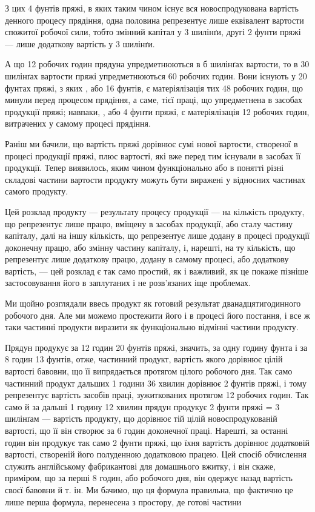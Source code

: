 З цих 4 фунтів пряжі, в яких таким чином існує вся новоспродукована вартість денного процесу
прядіння, одна половина
репрезентує лише еквівалент вартости спожитої робочої сили, тобто змінний капітал у 3 шилінґи, другі
2 фунти пряжі — лише додаткову вартість у 3 шилінґи.

А що 12 робочих годин прядуна упредметнюються в б шилінґах вартости, то в 30 шилінґах вартости пряжі
упредметнюються 60 робочих годин. Вони існують у 20 фунтах пряжі, з яких ,
або 16 фунтів, є матеріялізація тих 48 робочих годин, що минули перед процесом прядіння, а саме,
тієї праці, що упредметнена в засобах продукції пряжі; навпаки, , або 4 фунти пряжі, є
матеріялізація 12 робочих годин, витрачених у самому процесі прядіння.

Раніш ми бачили, що вартість пряжі дорівнює сумі нової вартости, створеної в процесі продукції
пряжі, плюс вартості,
які вже перед тим існували в засобах її продукції. Тепер виявилось, яким чином функціонально або в
понятті різні складові
частини вартости продукту можуть бути виражені у відносних частинах самого продукту.

Цей розклад продукту — результату процесу продукції — на кількість продукту, що репрезентує лише
працю, вміщену в
засобах продукції, або сталу частину капіталу, далі на іншу кількість, що репрезентує лише додану в
процесі продукції доконечну працю, або змінну частину капіталу, і, нарешті, на ту
кількість, що репрезентує лише додаткову працю, додану в самому процесі, або додаткову вартість, —
цей розклад є так само простий, як і важливий, як це покаже пізніше застосовування його в заплутаних
і не розв’язаних іще проблемах.

Ми щойно розглядали ввесь продукт як готовий результат дванадцятигодинного робочого дня. Але ми
можемо простежити
його і в процесі його постання, і все ж таки частинні продукти виразити як функціонально відмінні
частини продукту.

Прядун продукує за 12 годин 20 фунтів пряжі, значить, за одну годину  фунта і за 8 годин 13
фунтів, отже, частинний
продукт, вартість якого дорівнює цілій вартості бавовни, що її випрядається протягом цілого робочого
дня. Так само частинний продукт дальших 1 години 36 хвилин дорівнює 2 фунтів пряжі,
і тому репрезентує вартість засобів праці, зужиткованих протягом 12 робочих годин. Так само й за
дальші 1 годину 12 хвилин
прядун продукує 2 фунти пряжі = 3 шилінґам — вартість продукту, що дорівнює тій цілій
новоспродукованій вартості, що її він створює за 6 годин доконечної праці. Нарешті, за останні 
годин він продукує так само 2 фунти пряжі, що їхня вартість дорівнює додатковій вартості, створеній
його полуденною додатковою працею.
Цей спосіб обчислення служить англійському фабрикантові для домашнього вжитку, і він скаже,
приміром, що за перші 8 годин, або  робочого дня, він одержує назад вартість своєї бавовни
й т. ін. Ми бачимо, що ця формула правильна, що фактично це лише перша формула, перенесена з
простору, де готові частини
\parbreak{}  %
